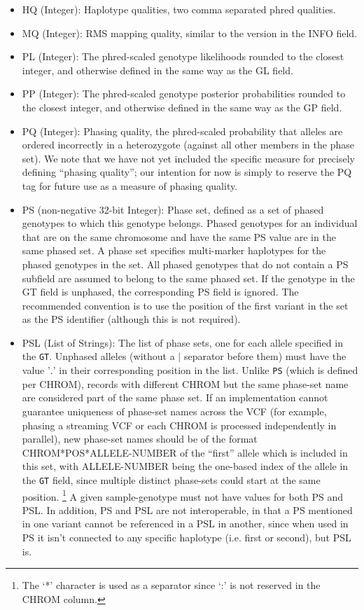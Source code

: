 \documentclass[8pt]{article}
\begin{document}
\begin{itemize}
  \item HQ (Integer): Haplotype qualities, two comma separated phred qualities.
  \item MQ (Integer): RMS mapping quality, similar to the version in the INFO field.
  \item PL (Integer): The phred-scaled genotype likelihoods rounded to the closest integer, and otherwise defined in the same way as the GL field.
  \item PP (Integer): The phred-scaled genotype posterior probabilities rounded to the closest integer, and otherwise defined in the same way as the GP field.
  \item PQ (Integer): Phasing quality, the phred-scaled probability that alleles are ordered incorrectly in a heterozygote (against all other members in the phase set).
  We note that we have not yet included the specific measure for precisely defining ``phasing quality''; our intention for now is simply to reserve the PQ tag for future use as a measure of phasing quality.
  \item PS (non-negative 32-bit Integer): Phase set, defined as a set of phased genotypes to which this genotype belongs.
  Phased genotypes for an individual that are on the same chromosome and have the same PS value are in the same phased set.
  A phase set specifies multi-marker haplotypes for the phased genotypes in the set.
  All phased genotypes that do not contain a PS subfield are assumed to belong to the same phased set.
  If the genotype in the GT field is unphased, the corresponding PS field is ignored.
  The recommended convention is to use the position of the first variant in the set as the PS identifier (although this is not required).
  \item PSL (List of Strings): The list of phase sets, one for each allele specified in the {\tt GT}.
  Unphased alleles (without a $\mid$ separator before them) must have the value '$.$' in their corresponding position in the list.
  Unlike {\tt PS} (which is defined per CHROM), records with different CHROM but the same phase-set name are considered part of the same phase set.
  If an implementation cannot guarantee uniqueness of phase-set names across the VCF (for example, phasing a streaming VCF or each CHROM is processed independently in parallel), new phase-set names should be of the format CHROM*POS*ALLELE-NUMBER of the ``first'' allele which is included in this set, with ALLELE-NUMBER being the one-based index of the allele in the {\tt GT} field, since multiple distinct phase-sets could start at the same position. \footnote{The `*' character is used as a separator since `:' is not reserved in the CHROM column.}
  A given sample-genotype must not have values for both PS and PSL.
  In addition, PS and PSL are not interoperable, in that a PS mentioned in one variant cannot be referenced in a PSL in another,  since when used in PS it isn't connected to any specific haplotype (i.e. first or second), but PSL is.


\end{itemize}
\end{document}
